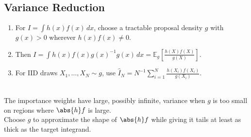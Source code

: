 \subsection{Variance Reduction}

\begin{method} \label{method:importance-sampling} 
\begin{enumerate}[label=(\roman*)]
\setlength{\itemsep}{0pt}
\item For $I=\int h(x)f(x)\,dx$, choose a tractable proposal density $g$ with $g(x)>0$ wherever $h(x)f(x)\neq0$.
\item Then $I=\int h(x)f(x)g(x)^{-1}g(x)\,dx=\mathbb{E}_g\left[\frac{h(X)f(X)}{g(X)}\right]$.
\item For IID draws $X_1,\ldots,X_N\sim g$, use $\widehat{I}_N=N^{-1}\sum\limits_{i=1}^{N}\frac{h(X_i)f(X_i)}{g(X_i)}$.
\end{enumerate}
\end{method}

\begin{remark} \label{rem:importance-sampling-tail-rule} \\
The importance weights have large, possibly infinite, variance when $g$ is too small on regions where $\abs{h}f$ is large.\\
Choose $g$ to approximate the shape of $\abs{h}f$ while giving it tails at least as thick as the target integrand.
\end{remark}

